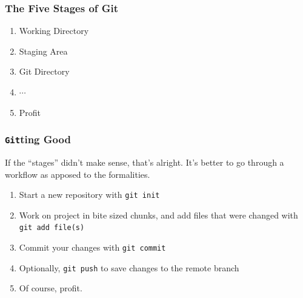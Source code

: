 \documentclass{beamer}
\newcounter{committing}
\newcommand{\shellcmd}[1]{\texttt{\colorbox{gray!30}{#1}}}
\begin{document}
\begin{frame}
    \frametitle{The Five Stages of Git}

    \begin{enumerate}
        \item Working Directory %
        \item Staging Area %
        \item Git Directory %
        \item $\cdots$
        \item Profit %
    \end{enumerate}
\end{frame}

\begin{frame}
    \frametitle{\shellcmd{Git}ting Good}

    If the ``stages'' didn't make sense, that's alright. It's better to go through a workflow as apposed to the formalities.

    \begin{enumerate}
        \item Start a new repository with \shellcmd{git init} %
        \item Work on project in bite sized chunks, and add files that were changed with \shellcmd{git add file(s)} %
        \item Commit your changes with \shellcmd{git commit} %
        \item Optionally, \shellcmd{git push} to save changes to the remote branch
        \item Of course, profit.
    \end{enumerate}
\end{frame}
\end{document}
